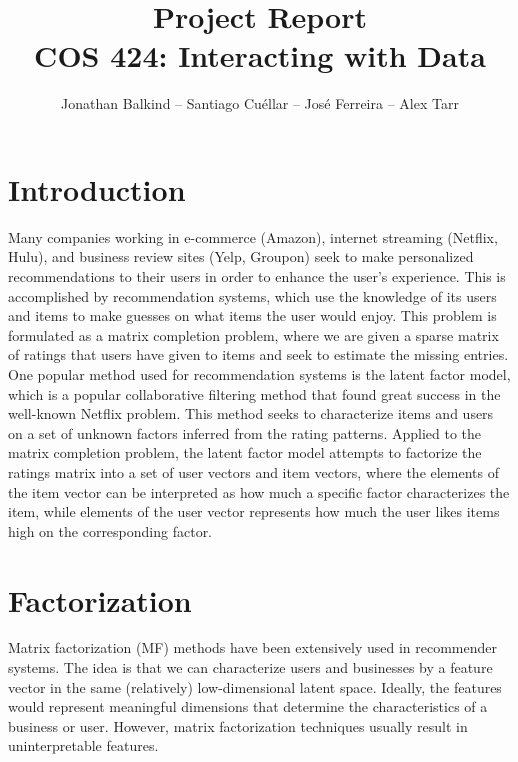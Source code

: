 \documentclass[12pt]{article}
\begin{document}
\title{Project Report \\ \vspace{5mm} \large{COS 424: Interacting with Data}}
\author{Jonathan Balkind -- Santiago Cu\'ellar -- Jos\'e Ferreira -- Alex Tarr} 
\maketitle

\begin{multicols}{2}

\section{Introduction} 
Many companies working in e-commerce (Amazon), internet streaming (Netflix, Hulu), and business review sites (Yelp, Groupon) seek 
to make personalized recommendations to their users in order to enhance the user's experience. This is accomplished by recommendation systems, 
which use the knowledge of its users and items to make guesses on what items the user would enjoy. This problem is formulated as a matrix completion 
problem, where we are given a sparse matrix of ratings that users have given to items and seek to estimate the missing entries.
	One popular method used for recommendation systems is the latent factor model, which is a popular collaborative filtering method that found great 
	success in the well-known Netflix problem. This method seeks to characterize items and users on a set of unknown factors inferred from the rating patterns. 
	Applied to the matrix completion problem, the latent factor model attempts to factorize the ratings matrix into a set 
	of user vectors and item vectors, where the elements of the item vector can be interpreted as how much a specific factor characterizes the item, while elements 
	of the user vector represents how much the user likes items high on the corresponding factor. 


\section{Factorization}

Matrix factorization (MF) methods have been extensively used in recommender systems. The idea is that we can characterize users and businesses by a feature vector in the same (relatively) low-dimensional latent space. Ideally, the features would represent meaningful dimensions that determine the characteristics of a business or user. However, matrix factorization techniques usually result in uninterpretable features. 


\end{multicols}
\end{document}
